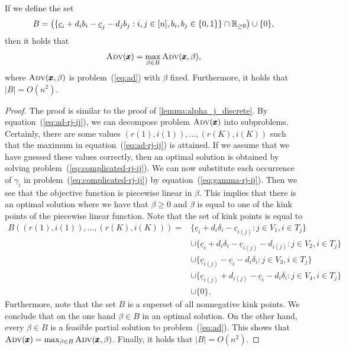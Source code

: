 \begin{lemma}
\label{lemma:beta_discrete}
  If we define the set
  \[ B = \left( \{ \underline{c}_i + d_i b_i - \underline{c}_j - d_j b_j : i,j\in[n], b_i,b_j\in\{0,1\} \} \cap \mathbb{R}_{\geq 0}\right) \cup \{0\}, \]
  then it holds that
  \[ \textsc{Adv}(\pmb{x}) = \max_{\beta \in B} \textsc{Adv}(\pmb{x},\beta), \]
  where $\textsc{Adv}(\pmb{x},\beta)$ is problem~(\ref{eq:ad}) with $\beta$ fixed. Furthermore, it holds that $|B| = O(n^2)$.
\end{lemma}
\begin{proof}
The proof is similar to the proof of \cref{lemma:alpha_j_discrete}. By equation~(\ref{eq:ad-rj-ij}), we can decompose problem $\textsc{Adv}(\pmb x)$ into subproblems. Certainly, there are some values $(r(1), i(1)), \dots, (r(K), i(K))$ such that the maximum in equation~(\ref{eq:ad-rj-ij}) is attained. If we assume that we have guessed these values correctly, then an optimal solution is obtained by solving problem~(\ref{eq:complicated-rj-ij}). We can now substitute each occurrence of $\gamma_i$ in problem~(\ref{eq:complicated-rj-ij}) by equation~(\ref{eq:gamma-rj-ij}). Then we see that the objective function is piecewise linear in $\beta$. 
This implies that there is an optimal solution where we have that $\beta \geq 0$ and $\beta$ is equal to one of the kink points of the piecewise linear function. Note that the set of kink points is equal to 
\begin{align*}
B((r(1),i(1)),\ldots,(r(K),i(K)))  = &\{ \underline{c}_i + d_i\delta_i - \underline{c}_{i(j)} : j \in V_1, i\in T_j\} \\
& \cup  \{ \underline{c}_i + d_i\delta_i - \underline{c}_{i(j)} - d_{i(j)} : j \in V_2, i\in T_j\} \\
& \cup  \{ \underline{c}_{i(j)} - \underline{c}_i - d_i\delta_i  : j \in V_3, i\in T_j\} \\
& \cup  \{  \underline{c}_{i(j)} + d_{i(j)} - \underline{c}_i - d_i\delta_i : j \in V_4, i\in T_j\} \\
& \cup \{0\}.
\end{align*}
Furthermore, note that the set $B$ is a superset of all nonnegative kink points. We conclude that on the one hand $\beta \in B$ in an optimal solution. On the other hand, every $\beta \in B$ is a feasible partial solution to problem~(\ref{eq:ad}). This shows that $\textsc{Adv}(\pmb{x}) = \max_{\beta \in B} \textsc{Adv}(\pmb{x},\beta)$. Finally, it holds that $|B| = O(n^2)$. 
\end{proof}


